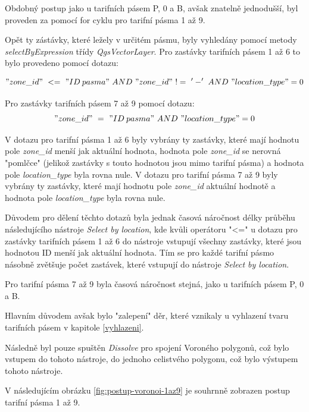 Obdobný postup jako u tarifních pásem P, 0 a B, avšak znatelně jednodušší, byl proveden za pomocí
for cyklu pro tarifní pásma 1 až 9. 

Opět ty zástávky, které ležely v určitém pásmu, byly vyhledány pomocí metody \textit{selectByExpression} třídy 
\textit{QgsVectorLayer}. Pro zastávky tarifních pásem 1 až 6 to bylo provedeno pomocí dotazu:

\["zone\_id"\ <=\ "ID\: pasma"\ AND\ "zone\_id"\ !=\ '-'\ AND\ "location\_type" = 0\]  

Pro zastávky tarifních pásem 7 až 9 pomocí dotazu:
\["zone\_id"\ =\ "ID\: pasma"\ AND\ "location\_type" = 0\] 

V dotazu pro tarifní pásma 1 až 6 byly vybrány ty zastávky, které mají hodnotu pole \textit{zone\_id} menší jak aktuální hodnota,
hodnota pole \textit{zone\_id} se nerovná "pomlčce" (jelikož zastávky s touto hodnotou jsou mimo tarifní pásma)
a hodnota pole \textit{location\_type} byla rovna nule. V dotazu pro tarifní pásma 7 až 9 byly vybrány ty zastávky,
které mají hodnotu pole \textit{zone\_id} aktuální hodnotě a hodnota pole \textit{location\_type} byla rovna nule.

Důvodem pro dělení těchto dotazů byla jednak časová náročnost délky průběhu následujícího nástroje \textit{Select by location}, 
kde kvůli operátoru "<=" u dotazu pro zastávky tarifních pásem 1 až 6 do nástroje vstupují všechny zastávky, 
které jsou hodnotou ID menší jak aktuální hodnota. Tím se pro každé tarifní pásmo násobně zvětšuje počet zastávek,
které vstupují do nástroje \textit{Select by location}.

Pro tarifní pásma 7 až 9 byla časová náročnost stejná, jako u tarifních pásem P, 0 a B.

Hlavním důvodem avšak bylo "zalepení" děr, které vznikaly u vyhlazení tvaru tarifních pásem v kapitole \ref{vyhlazeni}.  

Následně byl pouze spuštěn \textit{Dissolve} pro spojení Voroného polygonů, což bylo vstupem do tohoto nástroje,
do jednoho celistvého polygonu, což bylo výstupem tohoto nástroje.

V následujícím obrázku \ref{fig:postup-voronoi-1az9} je souhrnně zobrazen postup tarifní pásma 1 až 9.

